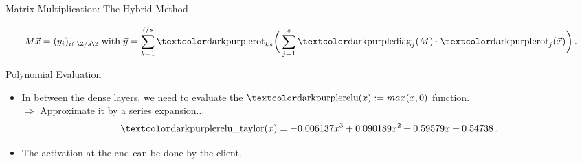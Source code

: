 \begin{frame}{Matrix Multiplication: The Hybrid Method}
  \begin{figure}[H]
    \centering
    \hspace{\matmulhoffset}
    \label{fig:hybrid-method}
  \end{figure}

  $$M \vec{x} = (y_i)_{i \in \Z/s\Z} \;\text{with}\; \vec{y} = \sum_{k=1}^{t / s} \rot_{ks}\bigg(\sum_{j=1}^s \diag_j(M) \cdot \rot_j(\vec{x})\bigg) \,.$$
\end{frame}

\begin{frame}{Polynomial Evaluation}
  \begin{itemize}
    \item In between the dense layers, we need to evaluate the $\cryptop{relu}(x) := max(x, 0)$ function. \\
          $\Rightarrow$ Approximate it by a series expansion...
          $$\cryptop{relu\_taylor}(x) = -0.006137 x^3 + 0.090189 x^2 + 0.59579 x + 0.54738 \,.$$
    \item The  activation at the end can be done by the client.
  \end{itemize}

  \begin{figure}[H]
    \centering
    \label{fig:taylor-relu}
  \end{figure}
\end{frame}
